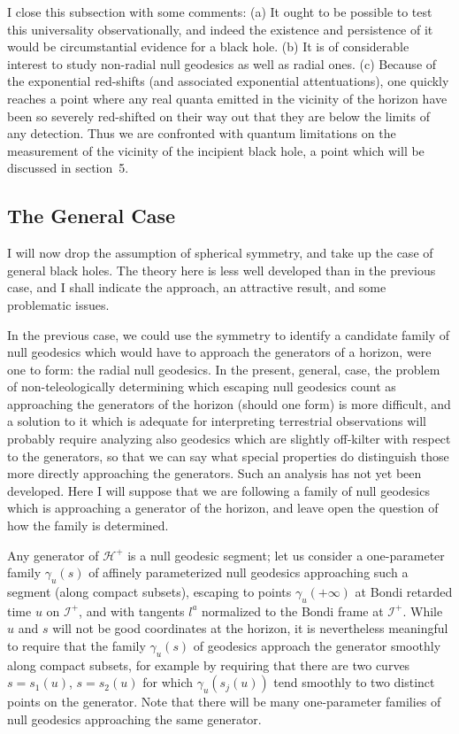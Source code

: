 \documentclass[12pt]{article}
\newcommand{\scrif}{{{\mathscr I}^{+}}}
\newcommand{\Hf}{{{\mathscr H}^{+}}} %
\begin{document}
I close this subsection with some comments:  
(a) It ought to be possible to test this universality observationally, and indeed the existence and persistence of it would be circumstantial evidence for a black hole.
(b) It is of considerable interest to study non-radial null geodesics as well as radial ones.
(c) Because of the exponential red-shifts (and associated exponential attentuations), one quickly reaches a point where any real quanta emitted in the vicinity of the horizon have been so severely 
red-shifted on their way out that they are below the limits of any detection.  Thus we are confronted with quantum limitations on the measurement of the vicinity of the incipient black 
hole, a point which will be discussed in section~5.

\subsection{The General Case}

I will now drop the assumption of spherical symmetry, and take up the case of general black holes.  The theory here is less well developed than in the previous case, and I shall indicate the approach, an attractive result, and some problematic issues.

In the previous case, we could use the symmetry to identify a candidate family of null geodesics which would have to approach the generators of a horizon, were one to form:  the radial null geodesics.
In the present, general, case, the problem of non-teleologically determining which escaping null geodesics count as approaching the generators of the horizon (should one form) is more difficult, and a solution to it which is adequate for interpreting 
terrestrial observations will probably require analyzing also 
geodesics which are slightly off-kilter with respect to the 
generators, so that we can say what special properties do 
distinguish those more directly approaching the generators.
Such an analysis has not yet been developed.  Here I will 
suppose that we are following a family of null geodesics which is 
approaching a generator of the horizon, and leave open the 
question of how the family is determined.

Any generator of $\Hf$ is a null geodesic segment; let us consider a one-parameter family $\gamma _u(s)$ of affinely parameterized null geodesics approaching such a segment (along compact subsets), escaping to points $\gamma _u(+\infty )$ at Bondi retarded time $u$ on $\scrif$, and with tangents $l^a$ normalized to the Bondi frame at $\scrif$.
While $u$ and $s$ will not be good coordinates at the horizon, it is nevertheless meaningful to require that the family $\gamma _u(s)$ of geodesics approach the generator smoothly along compact subsets, for example by requiring that there are two curves $s=s_1(u)$, $s=s_2(u)$ for which $\gamma _u(s_j(u))$ tend smoothly to two distinct points on the generator.
Note that there will be many one-parameter families of null geodesics approaching the same generator.
\end{document}
